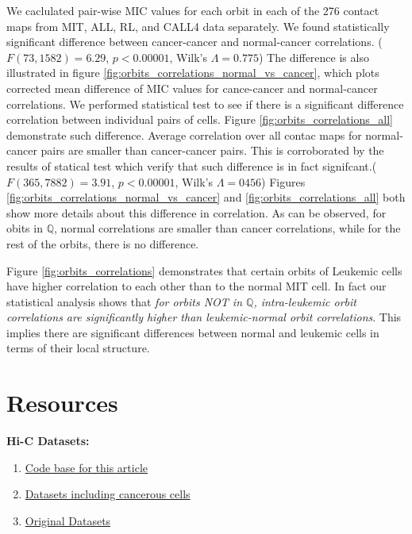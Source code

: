 \documentclass[]{article}
\begin{document}
We caclulated pair-wise MIC values 
for each orbit in each of the 276
contact maps from MIT, ALL, RL, and CALL4 data separately. 
We found statistically significant difference between
cancer-cancer and normal-cancer correlations.
($F(73, 1582)=6.29$, $p < 0.00001$, Wilk's $\Lambda = 0.775$)
 The difference  is also illustrated in figure
\ref{fig:orbits_correlations_normal_vs_cancer},
which plots corrected
mean difference of MIC values for cance-cancer and 
normal-cancer correlations.  
We performed statistical test to see if there is a 
significant difference correlation between individual pairs
of cells. Figure \ref{fig:orbits_correlations_all} demonstrate
such difference.
Average correlation over all contac maps
for normal-cancer pairs are smaller
than cancer-cancer pairs. This is corroborated
by the results of statical test which verify that such difference
is in fact signifcant.($F(365, 7882) = 3.91$, $p < 0.00001$, 
Wilk's $\Lambda = 0456$)
Figures \ref{fig:orbits_correlations_normal_vs_cancer} and
\ref{fig:orbits_correlations_all} both show more details about
this difference in correlation. As can be observed, for obits
in $\mathbb{Q}$, normal correlations are smaller than cancer
correlations, while for the rest of the orbits, there is no
difference.

Figure \ref{fig:orbits_correlations} demonstrates that certain
orbits of Leukemic cells
have higher correlation to each other 
than to the
normal MIT cell. In fact our statistical analysis shows that 
\textit {for orbits NOT in $\mathbb{Q}$, 
intra-leukemic orbit correlations are significantly higher
than leukemic-normal orbit correlations}. This implies
there are significant differences between normal and
leukemic cells in terms of their local structure.


\section{Resources}
\textbf{Hi-C Datasets:}
\begin{enumerate}
    \item \href{https://github.com/rasoolianbehnam/watson}{Code base for this article}
    \item \href{http://sysbio.rnet.missouri.edu/T0510/tmp_download/link_to_download_genome_data/}
        {Datasets including cancerous cells}
    \item \href{https://bcm.app.box.com/v/aidenlab/folder/11234760671}{Original Datasets}
\end{enumerate}



\end{document}
